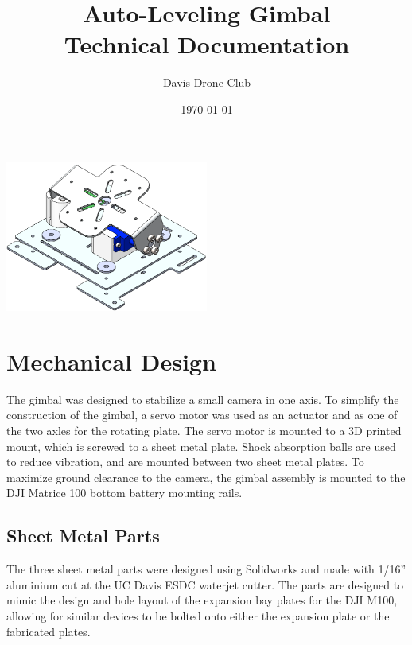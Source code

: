\documentclass[11pt]{article} %
\title{Auto-Leveling Gimbal \\ Technical Documentation}
\author{Davis Drone Club}
\date{\today} %
\begin{document}
\maketitle
\begin{center}
\includegraphics[width = 0.5\textwidth]{Pictures/cover.png}
\end{center}

\newpage
\tableofcontents
{}
\newpage
\listoffigures
\listoftables

\newpage
{}
\setlength{\parskip}{1em}
\section{Mechanical Design}

The gimbal was designed to stabilize a small camera in one axis. To simplify the construction of the gimbal, a servo motor was used as an actuator and as one of
the two axles for the rotating plate. The servo motor is mounted to a 3D printed mount, which is screwed to a sheet metal plate. Shock absorption balls are used to reduce vibration, and are mounted between two sheet metal plates. To maximize ground clearance to the camera, the gimbal assembly is mounted to the DJI Matrice 100 bottom battery mounting rails. 

\subsection{Sheet Metal Parts}
The three sheet metal parts were designed using Solidworks and made with 1/16'' aluminium cut at the UC Davis ESDC waterjet cutter. The parts are designed to mimic the design and hole layout of the expansion bay plates for the DJI M100, allowing for similar devices to be bolted onto either the expansion plate or the fabricated plates.
\end{document}
